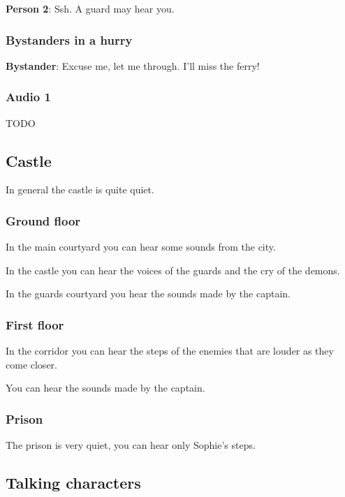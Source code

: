 \textbf{Person 2}: Ssh. A guard may hear you.

\subsubsection*{Bystanders in a hurry}
\textbf{Bystander}: Excuse me, let me through. I'll miss the ferry!

\subsubsection*{Audio 1}
TODO

\subsection{Castle}

In general the castle is quite quiet.

\subsubsection*{Ground floor}
In the main courtyard you can hear some sounds from the city.

In the castle you can hear the voices of the guards and the cry of the demons.

In the guards courtyard you hear the sounds made by the captain.

\subsubsection*{First floor}
In the corridor you can hear the steps of the enemies that are louder as they come closer.

You can hear the sounds made by the captain.

\subsubsection*{Prison}
The prison is very quiet, you can hear only Sophie's steps.

\subsection{Talking characters}

